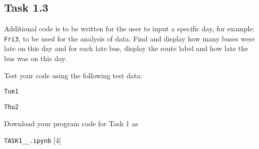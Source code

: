 \subsection*{Task 1.3}

Additional code is to be written for the user to input a specific
day, for example: \texttt{Fri3}, to be used for the analysis of data.
Find and display how many buses were late on this day and for each
late bus, display the route label and how late the bus was on this
day. 

Test your code using the following test data: 

\texttt{Tue1} 

\texttt{Thu2} 

Download your program code for Task 1 as 

\texttt{TASK1\_<your class>\_<your name>.ipynb} \hfill{}{[}4{]}